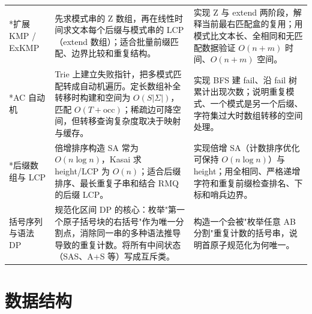 \documentclass[a4paper,11pt]{article}
\begin{document}
\begin{longtable}{L{2.4cm} L{7.5cm} L{6.8cm}}
*扩展 KMP / ExKMP
& 先求模式串的 Z 数组，再在线性时间求文本每个后缀与模式串的 LCP（extend 数组）；适合批量前缀匹配、边界比较和重复结构。
& 实现 Z 与 extend 两阶段，解释当前最右匹配盒的复用；用模式比文本长、全相同和无匹配数据验证 $O(n+m)$ 时间、$O(n+m)$ 空间。\\[2mm]

*AC 自动机
& Trie 上建立失败指针，把多模式匹配转成自动机遍历。定长数组补全转移时构建和空间为 $O(S|\Sigma|)$，匹配 $O(T+\text{occ})$；稀疏边可降空间，但转移查询复杂度取决于映射与缓存。
& 实现 BFS 建 fail、沿 fail 树累计出现次数；说明重复模式、一个模式是另一个后缀、字符集过大时数组转移的空间处理。\\[2mm]

*后缀数组与 LCP
& 倍增排序构造 SA 常为 $O(n\log n)$，Kasai 求 height/LCP 为 $O(n)$；适合后缀排序、最长重复子串和结合 RMQ 的后缀 LCP。
& 实现倍增 SA（计数排序优化可保持 $O(n\log n)$）与 height；用全相同、严格递增字符和重复前缀检查排名、下标和哨兵边界。\\[2mm]

括号序列与语法 DP
& 规范化区间 DP 的核心：枚举"第一个原子括号块的右括号"作为唯一分割点，消除同一串的多种语法推导导致的重复计数。将所有中间状态（SAS、A+S 等）写成互斥类。
& 构造一个会被"枚举任意 AB 分割"重复计数的括号串，说明首原子规范化为何唯一。\\
\end{longtable}

\newpage
\section{数据结构}
\end{document}
